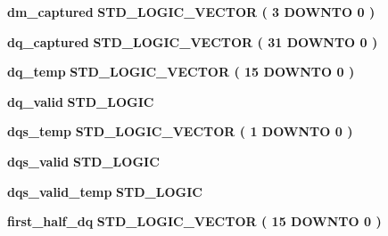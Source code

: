 \begin{DoxyCompactItemize}
\item 
{\bf dm\+\_\+captured} {\bfseries \textcolor{comment}{S\+T\+D\+\_\+\+L\+O\+G\+I\+C\+\_\+\+V\+E\+C\+T\+OR}\textcolor{vhdlchar}{ }\textcolor{vhdlchar}{(}\textcolor{vhdlchar}{ }\textcolor{vhdlchar}{ } \textcolor{vhdldigit}{3} \textcolor{vhdlchar}{ }\textcolor{keywordflow}{D\+O\+W\+N\+TO}\textcolor{vhdlchar}{ }\textcolor{vhdlchar}{ } \textcolor{vhdldigit}{0} \textcolor{vhdlchar}{ }\textcolor{vhdlchar}{)}\textcolor{vhdlchar}{ }} 
\item 
{\bf dq\+\_\+captured} {\bfseries \textcolor{comment}{S\+T\+D\+\_\+\+L\+O\+G\+I\+C\+\_\+\+V\+E\+C\+T\+OR}\textcolor{vhdlchar}{ }\textcolor{vhdlchar}{(}\textcolor{vhdlchar}{ }\textcolor{vhdlchar}{ } \textcolor{vhdldigit}{31} \textcolor{vhdlchar}{ }\textcolor{keywordflow}{D\+O\+W\+N\+TO}\textcolor{vhdlchar}{ }\textcolor{vhdlchar}{ } \textcolor{vhdldigit}{0} \textcolor{vhdlchar}{ }\textcolor{vhdlchar}{)}\textcolor{vhdlchar}{ }} 
\item 
{\bf dq\+\_\+temp} {\bfseries \textcolor{comment}{S\+T\+D\+\_\+\+L\+O\+G\+I\+C\+\_\+\+V\+E\+C\+T\+OR}\textcolor{vhdlchar}{ }\textcolor{vhdlchar}{(}\textcolor{vhdlchar}{ }\textcolor{vhdlchar}{ } \textcolor{vhdldigit}{15} \textcolor{vhdlchar}{ }\textcolor{keywordflow}{D\+O\+W\+N\+TO}\textcolor{vhdlchar}{ }\textcolor{vhdlchar}{ } \textcolor{vhdldigit}{0} \textcolor{vhdlchar}{ }\textcolor{vhdlchar}{)}\textcolor{vhdlchar}{ }} 
\item 
{\bf dq\+\_\+valid} {\bfseries \textcolor{comment}{S\+T\+D\+\_\+\+L\+O\+G\+IC}\textcolor{vhdlchar}{ }} 
\item 
{\bf dqs\+\_\+temp} {\bfseries \textcolor{comment}{S\+T\+D\+\_\+\+L\+O\+G\+I\+C\+\_\+\+V\+E\+C\+T\+OR}\textcolor{vhdlchar}{ }\textcolor{vhdlchar}{(}\textcolor{vhdlchar}{ }\textcolor{vhdlchar}{ } \textcolor{vhdldigit}{1} \textcolor{vhdlchar}{ }\textcolor{keywordflow}{D\+O\+W\+N\+TO}\textcolor{vhdlchar}{ }\textcolor{vhdlchar}{ } \textcolor{vhdldigit}{0} \textcolor{vhdlchar}{ }\textcolor{vhdlchar}{)}\textcolor{vhdlchar}{ }} 
\item 
{\bf dqs\+\_\+valid} {\bfseries \textcolor{comment}{S\+T\+D\+\_\+\+L\+O\+G\+IC}\textcolor{vhdlchar}{ }} 
\item 
{\bf dqs\+\_\+valid\+\_\+temp} {\bfseries \textcolor{comment}{S\+T\+D\+\_\+\+L\+O\+G\+IC}\textcolor{vhdlchar}{ }} 
\item 
{\bf first\+\_\+half\+\_\+dq} {\bfseries \textcolor{comment}{S\+T\+D\+\_\+\+L\+O\+G\+I\+C\+\_\+\+V\+E\+C\+T\+OR}\textcolor{vhdlchar}{ }\textcolor{vhdlchar}{(}\textcolor{vhdlchar}{ }\textcolor{vhdlchar}{ } \textcolor{vhdldigit}{15} \textcolor{vhdlchar}{ }\textcolor{keywordflow}{D\+O\+W\+N\+TO}\textcolor{vhdlchar}{ }\textcolor{vhdlchar}{ } \textcolor{vhdldigit}{0} \textcolor{vhdlchar}{ }\textcolor{vhdlchar}{)}\textcolor{vhdlchar}{ }} 

\end{DoxyCompactItemize}
